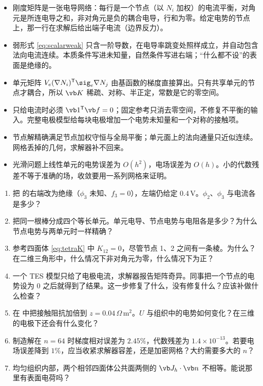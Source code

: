 \begin{takeaways}
\begin{itemize}
\item 刚度矩阵是一张电导网络：每行是一个节点（以 $N_i$ 加权）的电流平衡，对角元是所连电导之和，非对角元是负的耦合电导，行和为零。给定电势的节点上，那一行在求解后给出端子电流（边界反力）。
\item 弱形式 \eqref{eq:scalarweak} 只含一阶导数，在电导率跳变处照样成立，并自动包含法向电流连续。本质条件写进未知量，自然条件写进右端；“什么都不设”的表面是绝缘的。
\item 单元矩阵 $V_e(\nabla N_i)^{\mathsf T}\sig_e\nabla N_j$ 由基函数的梯度直接算出。只有共享单元的节点才耦合，所以 $\vb K$ 稀疏、对称、半正定，常数是它的零空间。
\item 只给电流时必须 $\vb 1^{\mathsf T}\vb f=0$；固定参考只消去零空间，不修复不平衡的输入。完整电极模型给每块电极增加一个电势未知量和一个对称的接触项。
\item 节点解精确满足节点加权守恒与全局平衡；单元面上的法向通量只近似连续。网格丢掉的几何，求解器补不回来。
\item 光滑问题上线性单元的电势误差为 $O(h^2)$，电场误差为 $O(h)$。小的代数残差不等于准确的场，收敛要用一系列网格来证明。
\end{itemize}
\end{takeaways}

\begin{selfcheck}
\begin{enumerate}
\item 把 的右端改为绝缘（$\phi_3$ 未知、$f_3=0$），左端仍给定 $0.4\,\mathrm V$。$\phi_2$、$\phi_3$ 与电流各是多少？
\item 把同一根棒分成四个等长单元。单元电导、节点电势与电阻各是多少？为什么节点电势与两单元时一样精确？
\item 参考四面体 \eqref{eq:tetraK} 中 $K_{12}=0$，尽管节点 1、2 之间有一条棱。为什么？在二维三角形中，什么情况下非对角元为零，什么情况下为正？
\item 一个 TES 模型只给了电极电流，求解器报告矩阵奇异。同事把一个节点的电势设为 $0$ 之后就得到了结果。这一步修复了什么，没有修复什么？应该补做什么检查？
\item 在 中把接触阻抗加倍到 $z=0.04\,\Omega\,\mathrm{m^2}$。$U$ 与组织中的电势如何变化？在三维的电极下还会有什么变化？
\item 制造解在 $n=64$ 时梯度相对误差为 $2.45\%$，代数残差为 $1.4\times10^{-13}$。若要电场误差降到 $1\%$，应当收紧求解器容差，还是加密网格？大约需要多大的 $n$？
\item 均匀组织内部，两个相邻四面体公共面两侧的 $\vb J_h\cdot\vb n$ 不相等。能说那里有表面电荷吗？
\end{enumerate}
\end{selfcheck}

